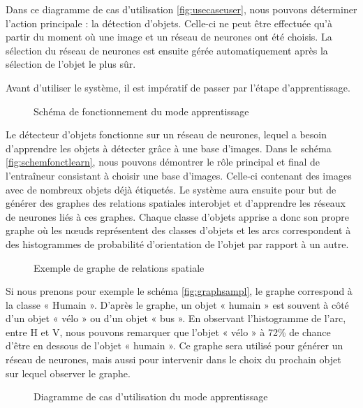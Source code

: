 \documentclass[debug,nodate,hideweeklyreports]{polytech/polytech}
\begin{document}
Dans ce diagramme de cas d’utilisation  \autoref{fig:usecaseuser}, nous pouvons déterminer l’action principale : la détection d’objets. Celle-ci ne peut être effectuée qu’à partir du moment où une image et un réseau de neurones ont été choisis. La sélection du réseau de neurones est ensuite gérée automatiquement après la sélection de l’objet le plus sûr. 

Avant d’utiliser le système, il est impératif de passer par l’étape d’apprentissage.

\begin{figure}[H]
  \caption{Schéma de fonctionnement du mode apprentissage}
  \label{fig:schemfonctlearn}
\end{figure}

Le détecteur d’objets fonctionne sur un réseau de neurones, lequel a besoin d’apprendre les objets à détecter grâce à une base d’images. Dans le schéma \autoref{fig:schemfonctlearn}, nous pouvons démontrer le rôle principal et final de l’entraîneur consistant à choisir une base d’images. Celle-ci contenant des images avec de nombreux objets déjà étiquetés. Le système aura ensuite pour but de générer des graphes des relations spatiales interobjet et d’apprendre les réseaux de neurones liés à ces graphes. Chaque classe d’objets apprise a donc son propre graphe où les nœuds représentent des classes d’objets et les arcs correspondent à des histogrammes de probabilité d’orientation de l’objet par rapport à un autre.

\begin{figure}[H]
  \caption{Exemple de graphe de relations spatiale}
  \label{fig:graphsampl}
\end{figure}

Si nous prenons pour exemple le schéma \autoref{fig:graphsampl}, le graphe correspond à la classe « Humain ». D’après le graphe, un objet « humain » est souvent à côté d’un objet « vélo » ou d’un objet « bus ». En observant l’histogramme de l’arc, entre H et V, nous pouvons remarquer que l’objet « vélo » à 72\% de chance d’être en dessous de l’objet « humain ».
Ce graphe sera utilisé pour générer un réseau de neurones, mais aussi pour intervenir dans le choix du prochain objet sur lequel observer le graphe.

\begin{figure}
  \caption{Diagramme de cas d'utilisation du mode apprentissage}
  \label{fig:usecaselearn}
\end{figure}
\end{document}
